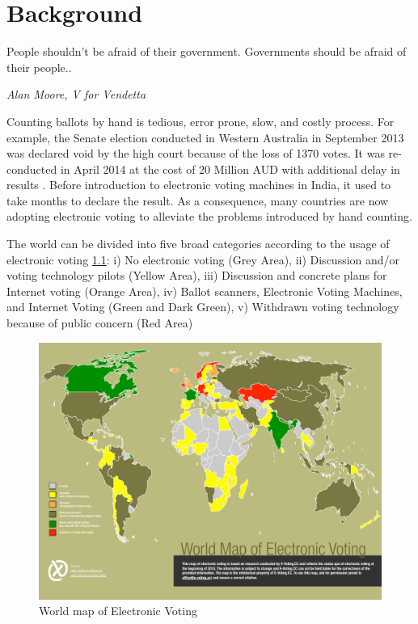 \chapter{Background}
\label{cha:background}


\epigraph{People shouldn't be afraid of their government. Governments should be afraid of their people..} 
{\textit{Alan Moore, V for Vendetta }}
  Counting ballots by hand is tedious, error prone, slow, and costly process. 
  For example, the Senate election conducted in Western Australia in September 2013 was 
  declared void by the high court because of the loss of 1370 votes. It was 
  re-conducted in April 2014 at the cost of 20 Million 
  AUD with additional  delay in results \citep{Aussentate}. Before introduction to 
  electronic voting machines in India, it used to take months to declare the result.
  As a consequence, many countries 
  are now adopting electronic voting to alleviate the problems introduced by hand counting. 
  
  The world can be divided into five broad categories according to 
  the usage of electronic voting \citep{Evoting} \ref{fig:world_electronic_voting_map}: i) No electronic 
  voting (Grey Area), ii)
  Discussion and/or voting technology pilots (Yellow Area), 
  iii) Discussion and concrete plans for Internet voting (Orange Area),
  iv) Ballot scanners, Electronic Voting Machines, and Internet Voting (Green and Dark Green),
  v) Withdrawn voting technology because of public concern (Red Area) 
    \begin{figure}[htb]
	\begin{center}
	\includegraphics[scale=0.5]{e-voting_worldmap_2015.pdf}
	\caption{World map of Electronic Voting}
	\label{fig:world_electronic_voting_map}
	\end{center}
  \end{figure}  
 
